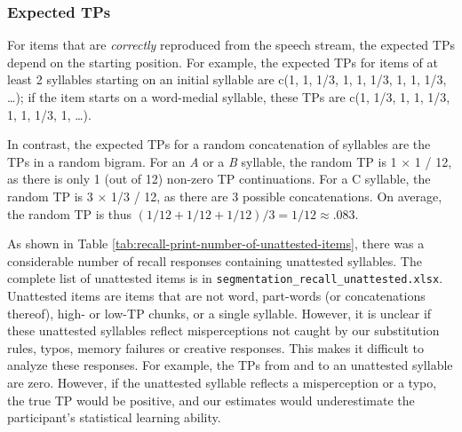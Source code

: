\documentclass[]{article}
\begin{document}
\subsubsection{Expected TPs}\label{expected-tps}

For items that are \emph{correctly} reproduced from the speech stream,
the expected TPs depend on the starting position. For example, the
expected TPs for items of at least 2 syllables starting on an initial
syllable are c(1, 1, 1/3, 1, 1, 1/3, 1, 1, 1/3, \ldots{}); if the item
starts on a word-medial syllable, these TPs are c(1, 1/3, 1, 1, 1/3, 1,
1, 1/3, 1, \ldots{}).

In contrast, the expected TPs for a random concatenation of syllables
are the TPs in a random bigram. For an \emph{A} or a \emph{B} syllable,
the random TP is 1 \(\times\) 1 / 12, as there is only 1 (out of 12)
non-zero TP continuations. For a C syllable, the random TP is 3
\(\times\) 1/3 / 12, as there are 3 possible concatenations. On average,
the random TP is thus \((1/12 + 1/12 + 1/12)/ 3 = 1/12 \approx .083\).

\begin{table}[!h]

\caption{\label{tab:recall-print-number-of-unattested-items}Number of unattested items}
\centering
{}
\end{table}

As shown in Table \ref{tab:recall-print-number-of-unattested-items},
there was a considerable number of recall responses containing
unattested syllables. The complete list of unattested items is in
\texttt{segmentation\_recall\_unattested.xlsx}. Unattested items are
items that are not word, part-words (or concatenations thereof), high-
or low-TP chunks, or a single syllable. However, it is unclear if these
unattested syllables reflect misperceptions not caught by our
substitution rules, typos, memory failures or creative responses. This
makes it difficult to analyze these responses. For example, the TPs from
and to an unattested syllable are zero. However, if the unattested
syllable reflects a misperception or a typo, the true TP would be
positive, and our estimates would underestimate the participant's
statistical learning ability.
\end{document}
